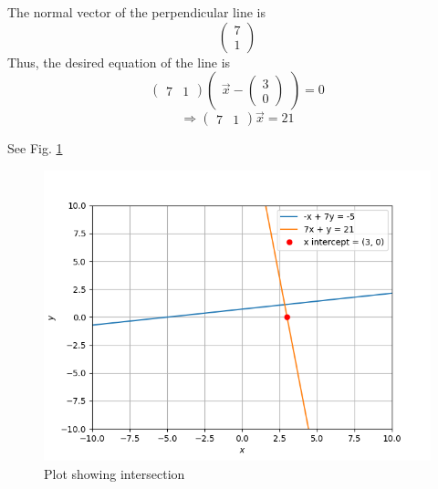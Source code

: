 The normal vector of the perpendicular line is
\begin{equation}
\begin{pmatrix}
7 \\
1
\end{pmatrix}       
\end{equation}
Thus, the desired equation of the line is 
\[
\begin{pmatrix}
7 & 1
\end{pmatrix}
\begin{pmatrix}
\vec{x} - 
\begin{pmatrix}
3 \\
0
\end{pmatrix}
\end{pmatrix} 
= 0
\]
\[
\Longrightarrow 
\begin{pmatrix}
7 & 1
\end{pmatrix}
\vec{x}
= 21
\]

See Fig.     \ref{fig:solutions_line_plane_37_a1}

\begin{figure}
    \centering
    \includegraphics[width=\columnwidth]{solutions/line_plane/37/A1/a1.png}
    \caption{Plot showing intersection}
    \label{fig:solutions_line_plane_37_a1}
\end{figure}
